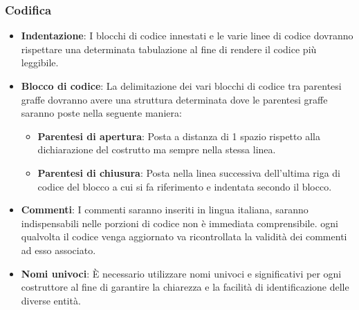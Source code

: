 \subsubsection{Codifica}
\begin{itemize}
    \item \textbf{Indentazione}: I blocchi di codice innestati e le varie linee di codice dovranno rispettare una determinata tabulazione al fine di rendere il codice più leggibile.
    \item \textbf{Blocco di codice}: La delimitazione dei vari blocchi di codice tra parentesi graffe dovranno avere una struttura determinata dove le parentesi 
    graffe saranno poste nella seguente maniera:
    \begin{itemize}
        \item \textbf{Parentesi di apertura}: Posta a distanza di 1 spazio rispetto alla dichiarazione del costrutto ma sempre nella stessa linea.
        \item \textbf{Parentesi di chiusura}: Posta nella linea successiva dell’ultima riga di codice del blocco a cui si fa riferimento e indentata secondo il blocco. 
    \end{itemize}
    \item \textbf{Commenti}: I commenti saranno inseriti in lingua italiana, saranno indispensabili nelle porzioni di codice non è immediata comprensibile. ogni qualvolta il codice 
    venga aggiornato va ricontrollata la validità dei commenti ad esso associato.
    \item \textbf{Nomi univoci}: È necessario utilizzare nomi univoci e significativi per ogni costruttore al fine di garantire la chiarezza e la facilità di identificazione delle diverse entità.
\end{itemize}









